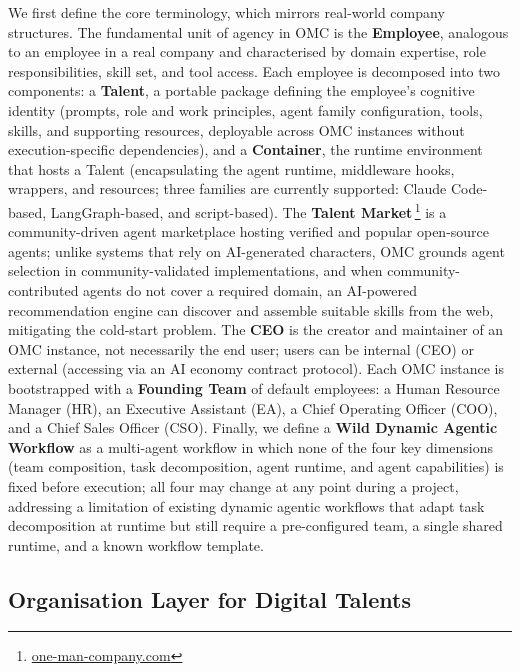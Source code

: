 \documentclass[11pt,a4paper]{article}
\begin{document}
We first define the core terminology, which mirrors real-world company structures.  The fundamental unit of agency in OMC is the \textbf{Employee}, analogous to an employee in a real company and characterised by domain expertise, role responsibilities, skill set, and tool access.  Each employee is decomposed into two components: a \textbf{Talent}, a portable package defining the employee’s cognitive identity (prompts, role and work principles, agent family configuration, tools, skills, and supporting resources, deployable across OMC instances without execution-specific dependencies), and a \textbf{Container}, the runtime environment that hosts a Talent (encapsulating the agent runtime, middleware hooks, wrappers, and resources; three families are currently supported: Claude Code-based, LangGraph-based, and script-based).  The \textbf{Talent Market}\,\footnote{\url{one-man-company.com}} is a community-driven agent marketplace hosting verified and popular open-source agents; unlike systems that rely on AI-generated characters, OMC grounds agent selection in community-validated implementations, and when community-contributed agents do not cover a required domain, an AI-powered recommendation engine can discover and assemble suitable skills from the web, mitigating the cold-start problem.  The \textbf{CEO} is the creator and maintainer of an OMC instance, not necessarily the end user; users can be internal (CEO) or external (accessing via an AI economy contract protocol).  Each OMC instance is bootstrapped with a \textbf{Founding Team} of default employees: a Human Resource Manager (HR), an Executive Assistant (EA), a Chief Operating Officer (COO), and a Chief Sales Officer (CSO).  Finally, we define a \textbf{Wild Dynamic Agentic Workflow} as a multi-agent workflow in which none of the four key dimensions (team composition, task decomposition, agent runtime, and agent capabilities) is fixed before execution; all four may change at any point during a project, addressing a limitation of existing dynamic agentic workflows that adapt task decomposition at runtime but still require a pre-configured team, a single shared runtime, and a known workflow template.

\subsection{Organisation Layer for Digital Talents}
\label{sec:harness}
\end{document}
